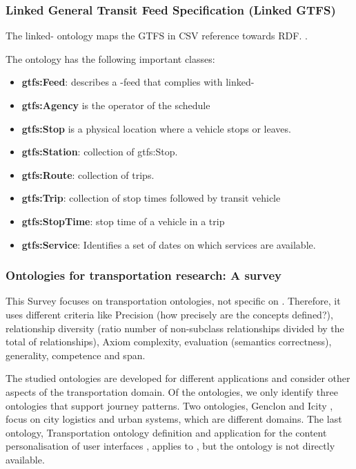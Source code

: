 \subsubsection{Linked General Transit Feed Specification (Linked GTFS)}
The linked- ontology maps the GTFS in CSV reference towards RDF. \cite{noauthor_opentransportlinked-gtfs_2023}\cite{noauthor_linked-gtfsspecmd_nodate}. 

The ontology has the following important classes:
\begin{itemize}
    \item \textbf{gtfs:Feed}: describes a -feed that complies with linked-
    \item \textbf{gtfs:Agency} is the operator of the schedule
    \item \textbf{gtfs:Stop} is a physical location where a vehicle stops or leaves.
    \item \textbf{gtfs:Station}: collection of gtfs:Stop.
    \item \textbf{gtfs:Route}: collection of trips.
    \item \textbf{gtfs:Trip}: collection of stop times followed by transit vehicle
    \item \textbf{gtfs:StopTime}: stop time of a vehicle in a trip
    \item \textbf{gtfs:Service}: Identifies a set of dates on which services are available.
\end{itemize}
\subsubsection{Ontologies for transportation research: A survey}
This Survey \cite{katsumi_ontologies_2018} focuses on transportation ontologies, not specific on . Therefore, it uses different criteria like Precision (how precisely are the concepts defined?), relationship diversity (ratio number of non-subclass relationships divided by the total of relationships), Axiom complexity, evaluation (semantics correctness), generality, competence and span. 

The studied ontologies are developed for different applications and consider other aspects of the transportation domain. Of the ontologies, we only identify three ontologies that support journey patterns. Two ontologies, Genclon\cite{anand_genclon_2012} and Icity \cite{noauthor_enterpriseintegrationlabicity_2023}, focus on city logistics and urban systems, which are different domains. The last ontology, Transportation ontology definition and application for the content personalisation of user interfaces  \cite{de_oliveira_transportation_2013}, applies to , but the ontology is not directly available.

